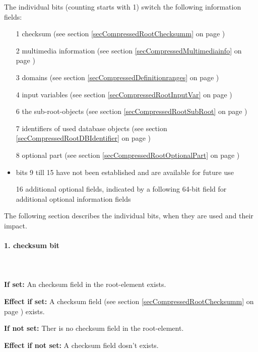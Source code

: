 \bigskip\noindent
The individual bits (counting starts with 1) switch the following information fields:
\begin{itemize}
 \item [1] checksum (see section \ref{secCompressedRootChecksumm} on page \pageref{secCompressedRootChecksumm})
 \item [2] multimedia information (see section \ref{secCompressedMultimediainfo} on page \pageref{secCompressedMultimediainfo})
 \item [3] domains (see section \ref{secCompressedDefinitionranges} on page \pageref{secCompressedDefinitionranges})
 \item [4] input variables (see section \ref{secCompressedRootInputVar} on page \pageref{secCompressedRootInputVar})
 \item [6] the sub-root-objects (see section \ref{secCompressedRootSubRoot} on page \pageref{secCompressedRootSubRoot})
 \item [7] identifiers of used database objects (see section \ref{secCompressedRootDBIdentifier} on page \pageref{secCompressedRootDBIdentifier})
 \item [8] optional part (see section \ref{secCompressedRootOptionalPart} on page \pageref{secCompressedRootOptionalPart})
 \item bits 9 till 15 have not been established and are available for future use
 \item [16] additional optional fields, indicated by a following 64-bit field for additional optional information fields
\end{itemize}

The following section describes the individual bits, when they are used and their impact.


\paragraph{1. checksum bit}

\ \\\\\noindent
\textbf{If set:} An checksum field in the root-element exists.

\bigskip\noindent
\textbf{Effect if set:}
A checksum field (see section \ref{secCompressedRootChecksumm} on page \pageref{secCompressedRootChecksumm}) exists.

\bigskip\noindent
\textbf{If not set:} Ther is no checksum field in the root-element.

\bigskip\noindent
\textbf{Effect if not set:}
A checksum field dosn't exists.


